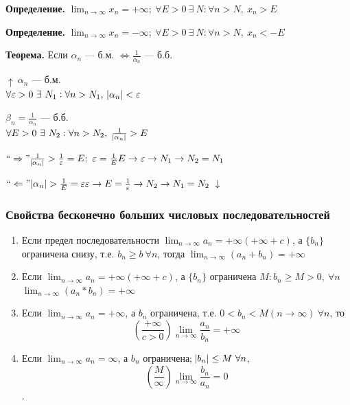 \documentclass{article}
\begin{document}
    \textbf{Определение.} \(\lim_{n \rightarrow \infty}{x_n} = +\infty;\ \forall E > 0\ \exists\ N : \forall n > N,\ x_n > E\)
    
    \textbf{Определение.} \(\lim_{n \rightarrow \infty}{x_n} = -\infty;\ \forall E > 0\ \exists\ N : \forall n > N,\ x_n < -E\)
    
    \textbf{Теорема.} Если \(\alpha_n\) --- б.м. \(\Leftrightarrow \frac{1}{\alpha_n}\) --- б.б.
    
    \(\uparrow\ \alpha_n\) --- б.м.\\
    \(\forall \varepsilon > 0\ \exists\ N_1 : \forall n > N_1,\ \abs{\alpha_n} < \varepsilon\)
    
    \(\beta_n = \frac{1}{\alpha_n}\) --- б.б.\\
    \(\forall E > 0\ \exists\ N_2 : \forall n > N_2,\ \frac{1}{\abs{\alpha_n}} > E\)
    
    \(``\Rightarrow" \frac{1}{\abs{\alpha_n}} > \frac{1}{\varepsilon} = E;\ \varepsilon = \frac{1}{E}\\
    E \rightarrow \varepsilon \rightarrow N_1 \rightarrow N_2 = N_1\)
    
    \(``\Leftarrow" \abs{\alpha_n} > \frac{1}{E} = \varepsilon\\
    \varepsilon \rightarrow E = \frac{1}{\varepsilon} \rightarrow N_2 \rightarrow N_1 = N_2\ \downarrow\)
    
    \subsubsection{Свойства бесконечно больших числовых последовательностей}
    
    \begin{enumerate}
        \item Если предел последовательности \( \lim_{n \rightarrow \infty }a_n = + \infty \)\( (+\infty + c) \), а \( \{b_n\} \) ограничена снизу, т.е. \( b_n \geq b\ \forall n \), тогда \(\lim_{n \rightarrow \infty}{(a_n + b_n)} = +\infty\)
       
        \item Если \( \lim_{n \rightarrow \infty }a_n = + \infty \)\( (+\infty + c) \), а \( \{b_n\} \) ограничена \( M: b_n \geq M > 0,\ \forall n \)
    \(\lim_{n \rightarrow \infty}{(a_n * b_n)} = +\infty\)

        \item Если \( \lim_{n \rightarrow \infty }a_n = +\infty \), а \( b_n \) ограничена, т.е. \( 0 < b_n < M (n \rightarrow \infty)\ \forall n \), то \[ (\frac{+\infty}{c > 0}) \lim_{n \rightarrow \infty}{\frac{a_n}{b_n}} = +\infty\]
    
        \item Если \(\lim_{n \rightarrow \infty}{a_n} = \infty\), а \(b_n\) ограничена; \(\abs{b_n} \leq M\  \forall n\), \[ (\frac{M}{\infty}) \lim_{n \rightarrow \infty }\frac{b_n}{a_n} = 0 \].
    \end{enumerate}
    
\end{document}
